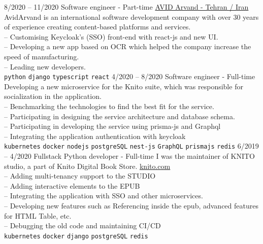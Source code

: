 \documentclass[9pt]{developercv}
\begin{document}
\begin{entrylist}
	\entry
	{8/2020 -- 11/2020}
	{Software engineer - Part-time}
	{
		\href{https://www.linkedin.com/company/avid-technology-development/}{AVID Arvand - Tehran / Iran}}
	{
		AvidArvand is an international software development company with over 30 years of experience creating content-based platforms and services. \\
		-- Customising Keycloak's (SSO) front-end with react-js and new UI. \\
		-- Developing a new app based on OCR which helped
		the company increase the speed of manufacturing. \\
		-- Leading new developers. \\
		\texttt{python}\slashsep
		\texttt{django}\slashsep
		\texttt{typescript}\slashsep
		\texttt{react}\slashsep
	}
	\entry
	{4/2020 -- 8/2020}
	{Software engineer - Full-time}
	{}
	{
		Developing a new microservice for the Knito suite, which was responsible for socialization in the application.\\
		-- Benchmarking the technologies to find the best fit for the service. \\
		-- Participating in designing the service architecture and database schema. \\
		-- Participating in developing the service using prisma-js and Graphql \\
		-- Integrating the application authentication with keycloak \\
		\texttt{kubernetes}\slashsep
		\texttt{docker}\slashsep
		\texttt{nodejs}\slashsep
		\texttt{postgreSQL}\slashsep
		\texttt{nest-js}\slashsep
		\texttt{GraphQL}\slashsep
		\texttt{prismajs}\slashsep
		\texttt{redis}\slashsep
	}
	\entry
	{6/2019 -- 4/2020}
	{Fullstack Python developer - Full-time}
	{}
	{
		I was the maintainer of KNITO studio, a part of Knito Digital Book Store.
		\href{https://knito.com/}{knito.com} \\
		-- Adding multi-tenancy support to the STUDIO \\
		-- Adding interactive elements to the EPUB \\
		-- Integrating the application with SSO and other microservices. \\
		-- Developing new features such as Referencing inside the epub, advanced features for HTML Table, etc. \\
		-- Debugging the old code and maintaining CI/CD \\
		\texttt{kubernetes}\slashsep
		\texttt{docker}\slashsep
		\texttt{django}\slashsep
		\texttt{postgreSQL}\slashsep
		\texttt{redis}\slashsep
}
\end{entrylist}
\end{document}
